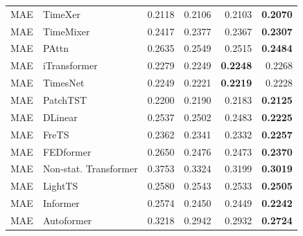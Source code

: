 \begin{longtable}{llrrrr}
MAE & TimeXer & 0.2118 & 0.2106 & 0.2103 & \textbf{0.2070} \\
MAE & TimeMixer & 0.2417 & 0.2377 & 0.2367 & \textbf{0.2307} \\
MAE & PAttn & 0.2635 & 0.2549 & 0.2515 & \textbf{0.2484} \\
MAE & iTransformer & 0.2279 & 0.2249 & \textbf{0.2248} & 0.2268 \\
MAE & TimesNet & 0.2249 & 0.2221 & \textbf{0.2219} & 0.2228 \\
MAE & PatchTST & 0.2200 & 0.2190 & 0.2183 & \textbf{0.2125} \\
MAE & DLinear & 0.2537 & 0.2502 & 0.2483 & \textbf{0.2225} \\
MAE & FreTS & 0.2362 & 0.2341 & 0.2332 & \textbf{0.2257} \\
MAE & FEDformer & 0.2650 & 0.2476 & 0.2473 & \textbf{0.2370} \\
MAE & Non-stat. Transformer & 0.3753 & 0.3324 & 0.3199 & \textbf{0.3019} \\
MAE & LightTS & 0.2580 & 0.2543 & 0.2533 & \textbf{0.2505} \\
MAE & Informer & 0.2574 & 0.2450 & 0.2449 & \textbf{0.2242} \\
MAE & Autoformer & 0.3218 & 0.2942 & 0.2932 & \textbf{0.2724} \\
\end{longtable}
\endgroup

